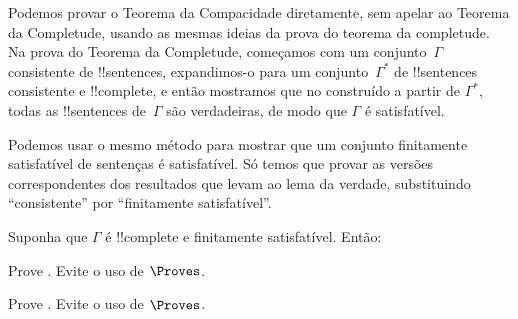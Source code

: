 \documentclass[../../../include/open-logic-section]{subfiles}
\begin{document}
      {}
      {}


Podemos provar o Teorema da Compacidade diretamente, sem apelar ao
Teorema da Completude, usando as mesmas ideias da prova do
teorema da completude.  Na prova do Teorema da Completude,
começamos com um conjunto~$\Gamma$ consistente de !!{sentence}s,
expandimos-o para um conjunto~$\Gamma^*$ de !!{sentence}s consistente e
!!{complete}, e então mostramos que no
construído a partir de $\Gamma^*$, todas as !!{sentence}s de~$\Gamma$ são verdadeiras,
de modo que $\Gamma$ é satisfatível.

Podemos usar o mesmo método para mostrar que um conjunto finitamente
satisfatível de sentenças é satisfatível. Só temos que provar as
versões correspondentes dos resultados que levam ao lema da verdade,
substituindo ``consistente'' por ``finitamente satisfatível''.

\begin{prop}
Suponha que $\Gamma$ é !!{complete} e finitamente satisfatível. Então:
\begin{enumerate}


\end{enumerate}
\end{prop}

\begin{prob}
Prove . Evite o uso de $\Proves$.
\end{prob}
\tagendprob

\begin{prob}
Prove . Evite o uso de $\Proves$.
\end{prob}
\tagendprob

\end{document}
